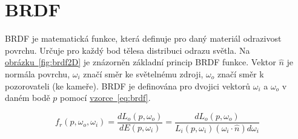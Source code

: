 \documentclass[czech,master]{diploma}
\newcommand{\uvec}[1]{\hat{#1}}
\newcommand{\point}{p}
\newcommand{\brdf}{f_r\left(\point,\omega_{o},\omega_{i}\right)}
\newcommand{\normVec}{\uvec{n}}
\newcommand{\inVec}{\omega_{i}}
\newcommand{\outVec}{\omega_{o}}
\newcommand{\outRadiance}{L_o\left(\point,\outVec\right)}
\newcommand{\inRadiance}{L_i\left(\point,\inVec\right)}
\newcommand{\irradiance}{dE\left(\point,\inVec\right)}
\newcommand{\inDotNorm}{\left(\inVec\cdot\normVec\right)}
\begin{document}
\clearpage
\chapter{BRDF}
BRDF je matematická funkce, která definuje pro daný materiál odrazivost povrchu. Určuje pro každý bod tělesa distribuci odrazu světla. Na \hyperref[fig:brdf2D]{obrázku~\ref{fig:brdf2D}} je znázorněn základní princip BRDF funkce. Vektor \(\normVec\) je normála povrchu, \(\inVec\) značí směr ke světelnému zdroji, \(\outVec\) značí směr k pozorovateli (ke kameře). BRDF je definována pro dvojici vektorů  \(\inVec\) a \(\outVec\) v daném bodě \(p\) pomocí \hyperref[eq:brdf]{vzorce~\ref{eq:brdf}}.

\begin{equation} \label{eq:brdf}
  \brdf = \frac{d\outRadiance}{\irradiance} = \frac{d\outRadiance}{\inRadiance \inDotNorm d\inVec}
\end{equation}
\end{document}
